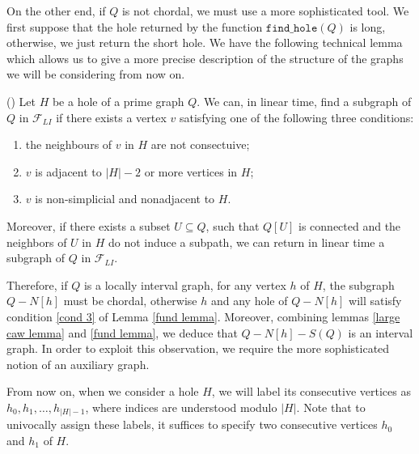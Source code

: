 \documentclass{article}
\begin{document}
    On the other end,
    if $Q$ is not
    chordal, we must use a
    more sophisticated tool.
    We first suppose that 
    the hole returned by
    the function $\texttt{find\_hole}\left(Q\right)$ 
    is long, otherwise,
    we just return the
    short hole.
    We have the following
    technical lemma which 
    allows us to give 
    a more precise description 
    of the structure
    of the graphs we will
    be considering from now on.
    
    \begin{lemma} (\cite{main}) \label{fund lemma}
        Let $H$ be a hole
        of a prime graph $Q$.
        We can, in linear time,
        find a subgraph of $Q$
        in $\mathcal{F}_{LI}$
        if there exists a vertex $v$ 
        satisfying one of the
        following three
        conditions:
        \begin{enumerate}
            \item the neighbours
                of $v$ in $H$ 
                are not consectuive;
            \item $v$ is adjacent
                to $\left|H\right| - 2$ 
                or more vertices in $H$;
            \item $v$ is non-simplicial and nonadjacent
               to $H$. \label{cond 3}
        \end{enumerate}
        Moreover, if there exists
        a subset $U \subseteq Q$, 
        such that $Q\left[U\right]$ 
        is connected and the
        neighbors of $U$ in
        $H$ do not induce
        a subpath, we can 
        return in linear
        time a subgraph of $Q$ 
        in $\mathcal{F}_{LI}$.
    \end{lemma}
    
    Therefore, if $Q$ is a
    locally interval graph,
    for any vertex $h$ of $H$, 
    the subgraph $Q - N\left[h\right]$ 
    must be chordal, otherwise
    $h$ and any hole of $Q - N\left[h\right]$
    will satisfy condition \ref{cond 3}
    of Lemma \ref{fund lemma}.
    Moreover, combining lemmas
    \ref{large caw lemma} 
    and \ref{fund lemma},
    we deduce that $Q - N\left[h\right] - S\left(Q\right)$ 
    is an interval graph.
    In order to exploit
    this observation,
    we require the more 
    sophisticated notion
    of an auxiliary graph.

    From now on, when we
    consider a hole $H$, 
    we will label its consecutive
    vertices as $h_{0}, h_{1}, \ldots, h_{\left|H\right|-1}$,
    where indices are understood modulo
    $\left|H\right|$. Note that to univocally 
    assign these labels, it suffices to
    specify two consecutive 
    vertices $h_0$ and $h_1$
    of $H$.
    
\end{document}
